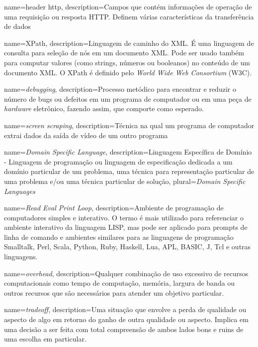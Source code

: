 				{name={header http},
				 description={Campos que contém informações de operação de uma requisição ou resposta HTTP. Definem várias características da transferência de dados}
				}

				{name={XPath},
				 description={Linguagem de caminho do XML. É uma linguagem de consulta para seleção de nós em um documento XML. Pode ser usado também para computar valores (como strings, números ou booleanos) no conteúdo de um documento XML. O XPath é definido pelo \emph{World Wide Web Consortium} (W3C).}
				}

				{name={\emph{debugging}},
				 description={Processo metódico para encontrar e reduzir o número de bugs ou defeitos em um programa de computador ou em uma peça de \emph{hardware} eletrônico, fazendo assim, que comporte como esperado.}
				}

				{name={\emph{screen scraping}},
				 description={Técnica na qual um programa de computador extrai dados da saída de vídeo de um outro programa}
				}
				
				{name={\emph{Domain Specific Language}},
				 description={Linguagem Específica de Domínio - Linguagem de programação ou linguagem de especificação dedicada a um domínio particular de um problema, uma técnica para representação particular de uma problema e/ou uma técnica particular de solução},
				 plural={\emph{Domain Specific Languages}}
				}
				
				{name={\emph{Read Eval Print Loop}},
				 description={Ambiente de programação de computadores simples e interativo. O termo é mais utilizado para referenciar o ambiente interativo da linguagem LISP, mas pode ser aplicado para prompts de linha de comando e ambientes similares para as linguagens de programação Smalltalk, Perl, Scala, Python, Ruby, Haskell, Lua, APL, BASIC, J, Tcl e outras linguagens.}
				}

				{name={\emph{overhead}},
				 description={Qualquer combinação de uso excessivo de recursos computacionais como tempo de computação, memória, largura de banda ou outros recursos que são necessários para atender um objetivo particular.}
				}

				{name={\emph{tradeoff}},
				 description={Uma situação que envolve a perda de qualidade ou aspecto de algo em retorno do ganho de outra qualidade ou aspecto. Implica em uma decisão a ser feita com total compreensão de ambos lados bons e ruins de uma escolha em particular.}
				 }

